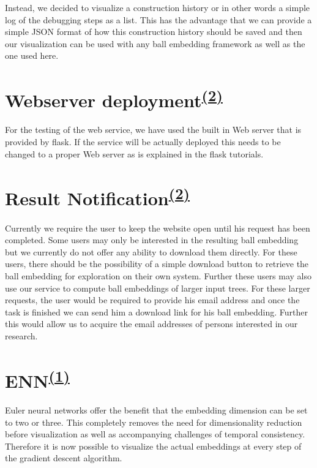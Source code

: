 Instead, we decided to visualize a construction history or in other words a simple log of the debugging steps as a list. This has the advantage that we can provide a simple JSON format of how this construction history should be saved and then our visualization can be used with any ball embedding framework as well as the one used here.


\section[Webserver deployment]{Webserver deployment\textsuperscript{\hyperref[Oliver]{(2)}}}
For the testing of the web service, we have used the built in Web server that is provided by flask. If the service will be actually deployed this needs to be changed to a proper Web server as is explained in the flask tutorials.

\section[Result Notification]{Result Notification\textsuperscript{\hyperref[Oliver]{(2)}}}
Currently we require the user to keep the website open until his request has been completed. Some users may only be interested in the resulting ball embedding but we currently do not offer any ability to download them directly. For these users, there should be the possibility of a simple download button to retrieve the ball embedding for exploration on their own system. Further these users may also use our service to compute ball embeddings of larger input trees. For these larger requests, the user would be required to provide his email address and once the task is finished we can send him a download link for his ball embedding. Further this would allow us to acquire the email addresses of persons interested in our research.

\section[ENN]{ENN\textsuperscript{\hyperref[Jan]{(1)}}}
Euler neural networks \cite{dong2020learning} offer the benefit that the embedding dimension can be set to two or three. This completely removes the need for dimensionality reduction before visualization as well as accompanying challenges of temporal consistency. Therefore it is now possible to visualize the actual embeddings at every step of the gradient descent algorithm.

